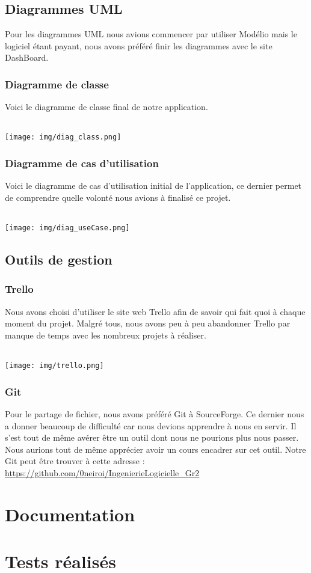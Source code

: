 \documentclass[a4paper,10pt]{report}
\begin{document}
  \chapter{Diagrammes UML}
    Pour les diagrammes UML nous avions commencer par utiliser Modélio mais le logiciel étant payant, nous avons préféré finir les diagrammes avec le site DashBoard. 
    \section{Diagramme de classe}
      Voici le diagramme de classe final de notre application.
      \paragraph{}
      \texttt{[image: img/diag\_class.png]}
      \newpage
    \section{Diagramme de cas d'utilisation}
      Voici le diagramme de cas d'utilisation initial de l'application, ce dernier permet de comprendre quelle volonté nous avions à finalisé ce projet.
      \paragraph{}
      \texttt{[image: img/diag\_useCase.png]}
  \chapter{Outils de gestion}
    \section{Trello}
      Nous avons choisi d'utiliser le site web Trello afin de savoir qui fait quoi à chaque moment du projet.
      Malgré tous, nous avons peu à peu abandonner Trello par manque de temps avec les nombreux projets à réaliser.
      \paragraph{}
      \texttt{[image: img/trello.png]}
    \section{Git}
      Pour le partage de fichier, nous avons préféré Git à SourceForge. Ce dernier nous a donner beaucoup de difficulté car nous devions apprendre à nous en servir.
      Il s'est tout de même avérer être un outil dont nous ne pourions plus nous passer. Nous aurions tout de même apprécier avoir un cours encadrer sur cet outil.
      Notre Git peut être trouver à cette adresse : \url{https://github.com/0neiroi/IngenierieLogicielle_Gr2}
      \part{Documentation}
\part{Tests réalisés}
\end{document}
